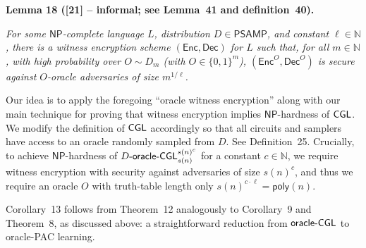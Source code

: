 \par\medskip\noindent\textbf{
\textbf{Lemma 18}\textbf{ }([21] – informal; see Lemma 41 and definition 40)\textbf{.}
}\par



\emph{For some ${\mathsf{NP}}$-complete language $L$, distribution $D\in{\mathsf{P}}{\mathsf{SAMP}}$, and constant $\ell\in\mathbb{N}$, there is a witness encryption scheme $({\mathsf{Enc}},{\mathsf{Dec}})$ for $L$ such that, for all $m\in\mathbb{N}$, with high probability over $O\sim D_{m}$ (with $O\in\{0,1\}^{m}$), $({\mathsf{Enc}}^{O},{\mathsf{Dec}}^{O})$ is secure against $O$-oracle adversaries of size $m^{1/\ell}$.}\par






Our idea is to apply the foregoing “oracle witness encryption” along with our main technique for proving that witness encryption implies ${\mathsf{NP}}$-hardness of ${\sf CGL}$. We modify the definition of ${\sf CGL}$ accordingly so that all circuits and samplers have access to an oracle randomly sampled from $D$. See Definition 25. Crucially, to achieve ${\mathsf{NP}}$-hardness of $D\text{-}{\sf oracle}\text{-}{\sf CGL}_{s(n)}^{s(n)^{c}}$ for a constant $c\in\mathbb{N}$, we require witness encryption with security against adversaries of size $s(n)^{c}$, and thus we require an oracle $O$ with truth-table length only $s(n)^{c\cdot\ell}={\mathsf{poly}}(n)$.\par




Corollary 13 follows from Theorem 12 analogously to Corollary 9 and Theorem 8, as discussed above: a straightforward reduction from ${\sf oracle}\text{-}{\sf CGL}$ to oracle-PAC learning.\par




